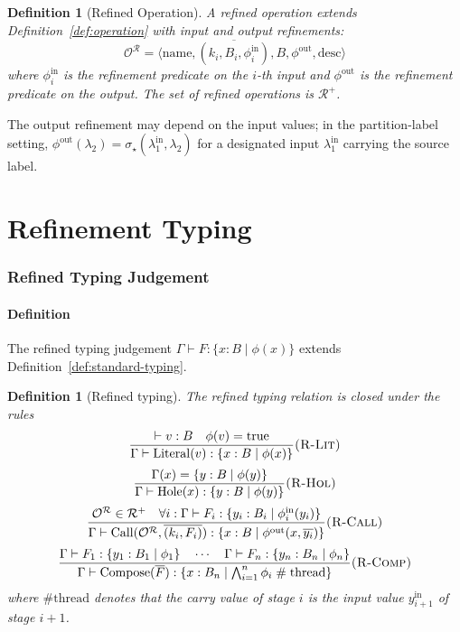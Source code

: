 \documentclass[twocolumn,11pt,a4paper]{article}
\newtheorem{definition}[theorem]{Definition}
\newcommand{\Reg}{\mathcal{R}}
\newcommand{\Sel}{\sigma}
\newcommand{\Frag}{F}
\newcommand{\Ctx}{\Gamma}
\newcommand{\Op}{\mathcal{O}}
\newcommand{\rul}[1]{\textsc{(#1)}}
\newcommand{\vCall}[2]{\mathrm{Call}(#1,#2)}
\newcommand{\vComp}[1]{\mathrm{Compose}(#1)}
\newcommand{\vLit}[1]{\mathrm{Literal}(#1)}
\newcommand{\vHol}[1]{\mathrm{Hole}(#1)}
\begin{document}
\begin{definition}[Refined Operation]
\label{def:refined-operation}
A \emph{refined operation} extends Definition~\ref{def:operation} with input and output refinements:
\[
\Op^\Reg = \langle \mathrm{name}, \overline{(k_i, B_i, \phi_i^{\mathrm{in}})}, B, \phi^{\mathrm{out}}, \mathrm{desc}\rangle
\]
where $\phi_i^{\mathrm{in}}$ is the refinement predicate on the $i$-th input and $\phi^{\mathrm{out}}$ is the refinement predicate on the output. The set of refined operations is $\Reg^+$.
\end{definition}

The output refinement may depend on the input values; in the partition-label setting, $\phi^{\mathrm{out}}(\lambda_2) = \Sel_\star(\lambda_1^{\mathrm{in}}, \lambda_2)$ for a designated input $\lambda_1^{\mathrm{in}}$ carrying the source label.

\part{Refinement Typing}

\section{Refined Typing Judgement}
\label{sec:refined-typing}

\subsection{Definition}

The refined typing judgement $\Ctx \vdash \Frag : \{x : B \mid \phi(x)\}$ extends Definition~\ref{def:standard-typing}.

\begin{definition}[Refined typing]
\label{def:refined-typing}
The refined typing relation is closed under the rules
\[
\frac{\vdash v : B \quad \phi(v) = \mathrm{true}}{\Ctx \vdash \vLit{v} : \{x : B \mid \phi(x)\}} \rul{R-Lit}
\]
\[
\frac{\Ctx(x) = \{y : B \mid \phi(y)\}}{\Ctx \vdash \vHol{x} : \{y : B \mid \phi(y)\}} \rul{R-Hol}
\]
\[
\frac{\Op^\Reg \in \Reg^+ \quad \forall i: \Ctx \vdash \Frag_i : \{y_i : B_i \mid \phi_i^{\mathrm{in}}(y_i)\}}{\Ctx \vdash \vCall{\Op^\Reg}{\overline{(k_i, \Frag_i)}} : \{x : B \mid \phi^{\mathrm{out}}(x, \overline{y_i})\}} \rul{R-Call}
\]
\[
\frac{\Ctx \vdash \Frag_1 : \{y_1 : B_1 \mid \phi_1\} \quad \cdots \quad \Ctx \vdash \Frag_n : \{y_n : B_n \mid \phi_n\}}{\Ctx \vdash \vComp{\overline{\Frag}} : \{x : B_n \mid \bigwedge_{i=1}^n \phi_i \mathrel{\#} \mathrm{thread}\}} \rul{R-Comp}
\]
where $\#\mathrm{thread}$ denotes that the carry value of stage $i$ is the input value $y_{i+1}^{\mathrm{in}}$ of stage $i+1$.
\end{definition}
\end{document}
